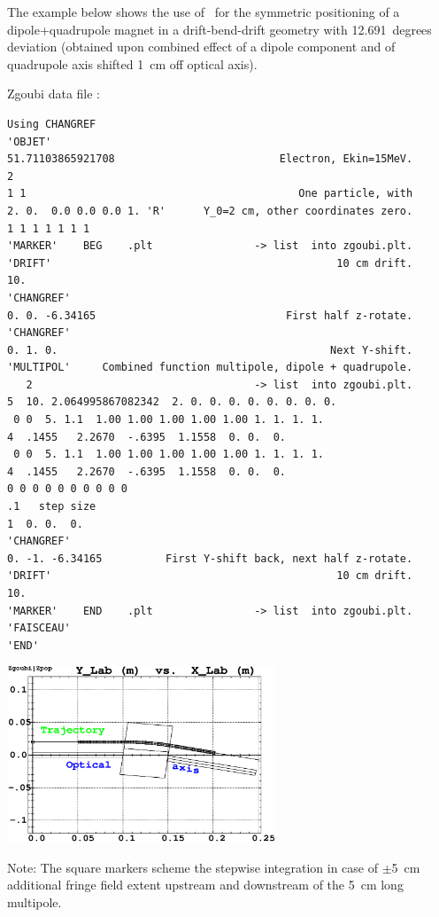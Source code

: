 \bigskip

\noindent The example below shows the use of  \CHANGREF\ for the symmetric positioning of 
a dipole+quadrupole  magnet in a drift-bend-drift geometry with 
12.691~degrees deviation (obtained upon combined effect of  a dipole component and 
of quadrupole axis shifted 1~cm off optical axis). 

\medskip

\begin{center}
\begin{minipage}{.38\linewidth}

 Zgoubi data file : 

\tiny
\begin{verbatim}
Using CHANGREF
'OBJET'
51.71103865921708                          Electron, Ekin=15MeV.
2
1 1                                           One particle, with
2. 0.  0.0 0.0 0.0 1. 'R'      Y_0=2 cm, other coordinates zero.
1 1 1 1 1 1 1 
'MARKER'    BEG    .plt                -> list  into zgoubi.plt.
'DRIFT'                                             10 cm drift.
10.
'CHANGREF'  
0. 0. -6.34165                              First half z-rotate.
'CHANGREF'  
0. 1. 0.                                           Next Y-shift.
'MULTIPOL'     Combined function multipole, dipole + quadrupole.
   2                                   -> list  into zgoubi.plt.
5  10. 2.064995867082342  2. 0. 0. 0. 0. 0. 0. 0. 0.
 0 0  5. 1.1  1.00 1.00 1.00 1.00 1.00 1. 1. 1. 1.                              
4  .1455   2.2670  -.6395  1.1558  0. 0.  0.                                    
 0 0  5. 1.1  1.00 1.00 1.00 1.00 1.00 1. 1. 1. 1.                              
4  .1455   2.2670  -.6395  1.1558  0. 0.  0.                                    
0 0 0 0 0 0 0 0 0 0
.1   step size
1  0. 0.  0.
'CHANGREF'
0. -1. -6.34165          First Y-shift back, next half z-rotate.
'DRIFT'                                             10 cm drift.
10.
'MARKER'    END    .plt                -> list  into zgoubi.plt.
'FAISCEAU'
'END'
\end{verbatim}
\normalsize
\end{minipage}\hspace{.05\linewidth}
\begin{minipage}{.5\linewidth}
\centerline{\includegraphics*[bbllx=20,bblly=100,bburx=567,bbury=470,width=8cm]{FigCHAREFb.eps}}

Note: The square markers scheme the stepwise integration in case of $\pm$5~cm additional fringe field 
extent upstream and downstream of the 5~cm long multipole. 
\end{minipage}
\end{center}


